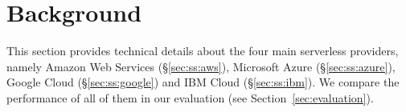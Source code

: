 
\section{Background}\label{sec:background}
This section provides technical details about the four main serverless providers, namely Amazon Web Services (\S\ref{sec:ss:aws}), Microsoft Azure (\S\ref{sec:ss:azure}), Google Cloud (\S\ref{sec:ss:google}) and IBM Cloud (\S\ref{sec:ss:ibm}). 
We compare the performance of all of them in our evaluation (see Section~\ref{sec:evaluation}).


